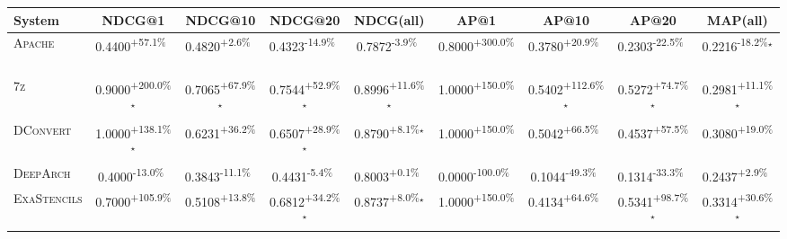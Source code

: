 \begin{table}[htbp]
\centering
\renewcommand{\arraystretch}{1.2}
\begin{tabular}{l|cccc|cccc}
\hline
System & NDCG@1 & NDCG@10 & NDCG@20 & NDCG(all) & AP@1 & AP@10 & AP@20 & MAP(all) \\ \hline
\textsc{Apache} & \cellcolor{green!30}0.4400\textsuperscript{+57.1\%}$^{\,\,\,}$ & \cellcolor{green!30}0.4820\textsuperscript{+2.6\%}$^{\,\,\,}$ & \cellcolor{red!30}0.4323\textsuperscript{-14.9\%}$^{\,\,\,}$ & \cellcolor{red!30}0.7872\textsuperscript{-3.9\%}$^{\,\,\,}$ & \cellcolor{green!30}0.8000\textsuperscript{+300.0\%}$^{\,\,\,}$ & \cellcolor{green!30}0.3780\textsuperscript{+20.9\%}$^{\,\,\,}$ & \cellcolor{red!30}0.2303\textsuperscript{-22.5\%}$^{\,\,\,}$ & \cellcolor{red!30}0.2216\textsuperscript{-18.2\%}$^\star$ \\
\textsc{7z} & \cellcolor{green!30}0.9000\textsuperscript{+200.0\%}$^\star$ & \cellcolor{green!30}0.7065\textsuperscript{+67.9\%}$^\star$ & \cellcolor{green!30}0.7544\textsuperscript{+52.9\%}$^\star$ & \cellcolor{green!30}0.8996\textsuperscript{+11.6\%}$^\star$ & \cellcolor{green!30}1.0000\textsuperscript{+150.0\%}$^{\,\,\,}$ & \cellcolor{green!30}0.5402\textsuperscript{+112.6\%}$^\star$ & \cellcolor{green!30}0.5272\textsuperscript{+74.7\%}$^\star$ & \cellcolor{green!30}0.2981\textsuperscript{+11.1\%}$^\star$ \\
\textsc{DConvert} & \cellcolor{green!30}1.0000\textsuperscript{+138.1\%}$^\star$ & \cellcolor{green!30}0.6231\textsuperscript{+36.2\%}$^{\,\,\,}$ & \cellcolor{green!30}0.6507\textsuperscript{+28.9\%}$^\star$ & \cellcolor{green!30}0.8790\textsuperscript{+8.1\%}$^\star$ & \cellcolor{green!30}1.0000\textsuperscript{+150.0\%}$^{\,\,\,}$ & \cellcolor{green!30}0.5042\textsuperscript{+66.5\%}$^{\,\,\,}$ & \cellcolor{green!30}0.4537\textsuperscript{+57.5\%}$^{\,\,\,}$ & \cellcolor{green!30}0.3080\textsuperscript{+19.0\%}$^{\,\,\,}$ \\
\textsc{DeepArch} & \cellcolor{red!30}0.4000\textsuperscript{-13.0\%}$^{\,\,\,}$ & \cellcolor{red!30}0.3843\textsuperscript{-11.1\%}$^{\,\,\,}$ & \cellcolor{red!30}0.4431\textsuperscript{-5.4\%}$^{\,\,\,}$ & \cellcolor{green!30}0.8003\textsuperscript{+0.1\%}$^{\,\,\,}$ & \cellcolor{red!30}0.0000\textsuperscript{-100.0\%}$^{\,\,\,}$ & \cellcolor{red!30}0.1044\textsuperscript{-49.3\%}$^{\,\,\,}$ & \cellcolor{red!30}0.1314\textsuperscript{-33.3\%}$^{\,\,\,}$ & \cellcolor{green!30}0.2437\textsuperscript{+2.9\%}$^{\,\,\,}$ \\
\textsc{ExaStencils} & \cellcolor{green!30}0.7000\textsuperscript{+105.9\%}$^{\,\,\,}$ & \cellcolor{green!30}0.5108\textsuperscript{+13.8\%}$^{\,\,\,}$ & \cellcolor{green!30}0.6812\textsuperscript{+34.2\%}$^\star$ & \cellcolor{green!30}0.8737\textsuperscript{+8.0\%}$^\star$ & \cellcolor{green!30}1.0000\textsuperscript{+150.0\%}$^{\,\,\,}$ & \cellcolor{green!30}0.4134\textsuperscript{+64.6\%}$^{\,\,\,}$ & \cellcolor{green!30}0.5341\textsuperscript{+98.7\%}$^\star$ & \cellcolor{green!30}0.3314\textsuperscript{+30.6\%}$^\star$ \\

\end{tabular}
\end{table}
